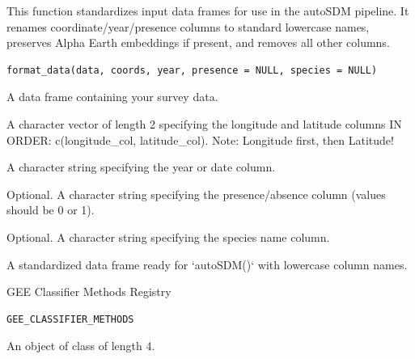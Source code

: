 \documentclass[letterpaper]{book}
\begin{document}
%
\begin{Description}
This function standardizes input data frames for use in the autoSDM pipeline.
It renames coordinate/year/presence columns to standard lowercase names,
preserves Alpha Earth embeddings if present, and removes all other columns.
\end{Description}
%
\begin{Usage}
\begin{verbatim}
format_data(data, coords, year, presence = NULL, species = NULL)
\end{verbatim}
\end{Usage}
%
\begin{Arguments}
\begin{ldescription}
\item[\code{data}] A data frame containing your survey data.

\item[\code{coords}] A character vector of length 2 specifying the longitude and latitude columns IN ORDER: c(longitude\_col, latitude\_col). Note: Longitude first, then Latitude!

\item[\code{year}] A character string specifying the year or date column.

\item[\code{presence}] Optional. A character string specifying the presence/absence column (values should be 0 or 1).

\item[\code{species}] Optional. A character string specifying the species name column.
\end{ldescription}
\end{Arguments}
%
\begin{Value}
A standardized data frame ready for `autoSDM()` with lowercase column names.
\end{Value}
%
\begin{Description}
GEE Classifier Methods Registry
\end{Description}
%
\begin{Usage}
\begin{verbatim}
GEE_CLASSIFIER_METHODS
\end{verbatim}
\end{Usage}
%
\begin{Format}
An object of class  of length 4.
\end{Format}
\end{document}
